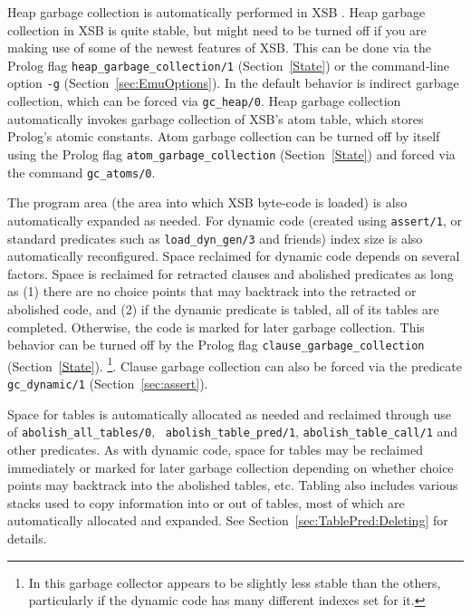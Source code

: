 %
Heap garbage collection is automatically performed in XSB
\cite{CaSC01,CATmem@ISMM-98}.  Heap garbage collection in XSB is quite
stable, but might need to be turned off if you are making use of some
of the newest features of XSB.  This can be done via the Prolog flag
{\tt heap\_garbage\_collection/1} (Section~\ref{State}) or the
command-line option {\tt -g} (Section~\ref{sec:EmuOptions}).  In
\version{} the default behavior is indirect garbage collection, which
can be forced via {\tt gc\_heap/0}.  Heap garbage collection
automatically invokes garbage collection of XSB's atom table, which
stores Prolog's atomic constants.  Atom
garbage collection can be turned off by itself using the Prolog flag
{\tt atom\_garbage\_collection} (Section~\ref{State}) and forced via the
command {\tt gc\_atoms/0}.

The program area (the area into which XSB byte-code is loaded) is also
automatically expanded as needed.  For dynamic code (created using
{\tt assert/1}, or standard predicates such as {\tt load\_dyn\_gen/3}
and friends) index size is also automatically reconfigured.  Space
reclaimed for dynamic code depends on several factors.
Space is reclaimed for retracted clauses and abolished predicates as
long as (1) there are no choice points that may backtrack into the
retracted or abolished code, and (2) if the dynamic predicate is
tabled, all of its tables are completed.  Otherwise, the code is
marked for later garbage collection.  This behavior can be turned off
by the Prolog flag {\tt clause\_garbage\_collection}
(Section~\ref{State}). \footnote{In \version{} this garbage collector
  appears to be slightly less stable than the others, particularly if
  the dynamic code has many different indexes set for it.}.  Clause
garbage collection can also be forced via the predicate {\tt
  gc\_dynamic/1} (Section~\ref{sec:assert}).

Space for tables is automatically allocated as needed and reclaimed
through use of {\tt abolish\_all\_tables/0}, {\tt
  abolish\_table\_pred/1}, {\tt abolish\_table\_call/1} and other
predicates.  As with dynamic code, space for tables may be reclaimed
immediately or marked for later garbage collection depending on
whether choice points may backtrack into the abolished tables,
etc.  Tabling also includes various stacks used to copy information
into or out of tables, most of which are automatically allocated and
expanded.
See Section~\ref{sec:TablePred:Deleting} for details.



